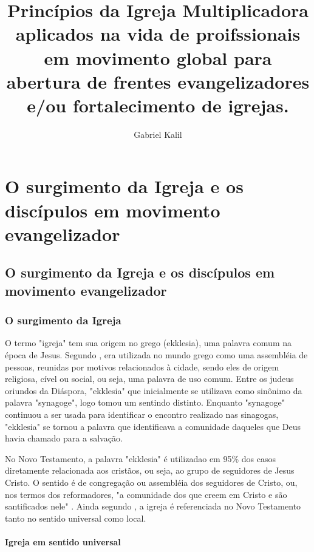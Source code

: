 \documentclass[
	12pt,				%
	openright,			%
	twoside,			%
	a4paper,			%
	english,			%
	french,				%
	spanish,			%
	brazil				%
	]{abntex2}
\title{Princípios da Igreja Multiplicadora aplicados na vida de proifssionais em movimento global para abertura de frentes evangelizadores e/ou fortalecimento de igrejas.}
\author{Gabriel Kalil}
\date{ }
\begin{document}
  
\maketitle
  
\tableofcontents

\chapter{O surgimento da Igreja e os discípulos em movimento evangelizador}


\section{O surgimento da Igreja e os discípulos em movimento evangelizador}
 
\subsection{O surgimento da Igreja}

O termo "igreja" tem sua origem no grego (ekklesia), uma palavra comum na época de Jesus. Segundo \cite[317]{zac}, era utilizada no mundo grego como uma assembléia de pessoas, reunidas por motivos relacionados à cidade, sendo eles de origem religiosa, cível ou social, ou seja, uma palavra de uso comum. Entre os judeus oriundos da Diáspora, "ekklesia" que inicialmente se utilizava como sinônimo da palavra "synagoge", logo tomou um sentindo distinto. Enquanto "synagoge" continuou a ser usada para identificar o encontro realizado nas sinagogas, "ekklesia" se tornou a palavra que identificava a comunidade daqueles que Deus havia chamado para a salvação\cite[485]{bavinck}. 

No Novo Testamento, a palavra "ekklesia" é utilizadao em 95\% dos casos diretamente relacionada aos cristãos, ou seja, ao grupo de seguidores de Jesus Cristo. O sentido é de congregação ou assembléia dos seguidores de Cristo, ou, nos termos dos reformadores, "a comunidade dos que creem em Cristo e são santificados nele" \cite[318]{zac}. Ainda segundo \cite[318]{zac}, a igreja é referenciada no Novo Testamento tanto no sentido universal como local. 

\subsubsection{Igreja em sentido universal}
\end{document}
